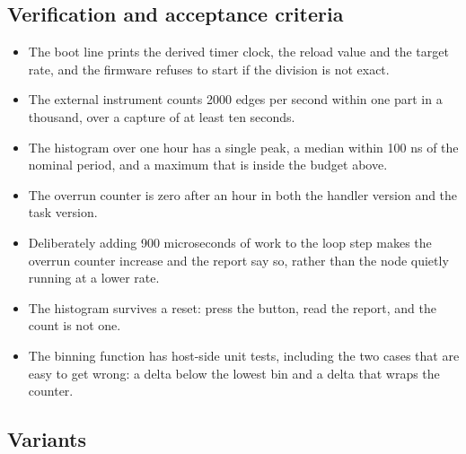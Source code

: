 \subsection*{Verification and acceptance criteria}

\begin{itemize}
\item The boot line prints the derived timer clock, the reload value and the
target rate, and the firmware refuses to start if the division is not exact.
\item The external instrument counts 2000 edges per second within one part in a
thousand, over a capture of at least ten seconds.
\item The histogram over one hour has a single peak, a median within 100 ns of
the nominal period, and a maximum that is inside the budget above.
\item The overrun counter is zero after an hour in both the handler version and
the task version.
\item Deliberately adding 900 microseconds of work to the loop step makes the
overrun counter increase and the report say so, rather than the node quietly
running at a lower rate.
\item The histogram survives a reset: press the button, read the report, and the
count is not one.
\item The binning function has host-side unit tests, including the two cases
that are easy to get wrong: a delta below the lowest bin and a delta that wraps
the counter.
\end{itemize}

\subsection*{Variants}

